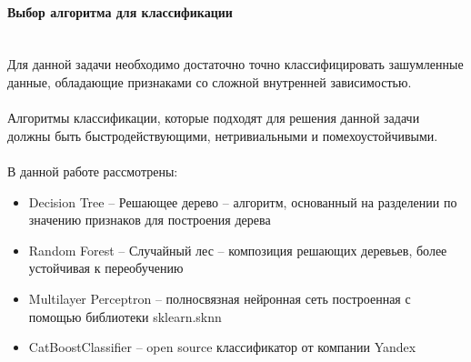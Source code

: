     
        \paragraph{Выбор алгоритма для классификации}
        \noindent\\
        
            \noindent
            Для данной задачи необходимо достаточно точно классифицировать зашумленные данные, обладающие признаками со сложной внутренней зависимостью. \\ \\
            Алгоритмы классификации, которые подходят для решения данной задачи должны быть быстродействующими, нетривиальными и помехоустойчивыми. \\ \\
            В данной работе рассмотрены: 
            \begin{itemize}
                \item Decision Tree -- Решающее дерево -- алгоритм, основанный на разделении по значению признаков для построения дерева
                \item Random Forest -- Случайный лес -- композиция решающих деревьев, более устойчивая к переобучению
                \item Multilayer Perceptron -- полносвязная нейронная сеть построенная с помощью библиотеки sklearn.sknn
                \item CatBoostClassifier -- open source классификатор от компании Yandex
            \end{itemize}   
            
